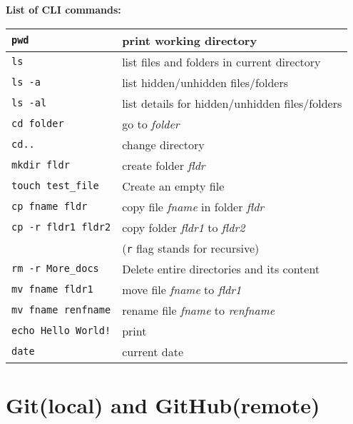\documentclass[a4paper,12pt]{report}
\newcommand{\code}[1]{\texttt{#1} }
\begin{document}
\textbf{List of CLI commands:}\\
\begin{table}[H]
\centering
\begin{tabular}{|l|l|}
  \hline
  \code{\textcolor[rgb]{0,0,1}{pwd}} & print working directory \\
	\hline
  \code{\textcolor[rgb]{0,0,1}{ls}} & list files and folders in current directory \\
	\hline
  \code{\textcolor[rgb]{0,0,1}{ls} \textcolor[rgb]{1,0,0}{-a}} & list hidden/unhidden files/folders \\
	\hline
  \code{\textcolor[rgb]{0,0,1}{ls} \textcolor[rgb]{1,0,0}{-al}} & list details for hidden/unhidden files/folders \\
	\hline
	\code{\textcolor[rgb]{0,0,1}{cd} folder} & go to \textit{folder}\\
	\hline
	\code{\textcolor[rgb]{0,0,1}{cd}..} & change directory \\
	\hline
	\code{\textcolor[rgb]{0,0,1}{mkdir} fldr} & create folder \textit{fldr} \\
	\hline
	\code{\textcolor[rgb]{0,0,1}{touch} test\_file} & Create an empty file \\
	\hline
	\code{\textcolor[rgb]{0,0,1}{cp} fname fldr}  & copy file \textit{fname} in folder \textit{fldr} \\
	\hline
	\code{\textcolor[rgb]{0,0,1}{cp} \textcolor[rgb]{1,0,0}{-r} fldr1 fldr2}  & copy folder \textit{fldr1} to \textit{fldr2}  \\
	& (\code{\-r} flag stands for recursive) \\
	\hline
	\code{\textcolor[rgb]{0,0,1}{rm} \textcolor[rgb]{1,0,0}{-r} More\_docs} & Delete entire directories and its content \\
	\hline
	\code{\textcolor[rgb]{0,0,1}{mv} fname fldr1} & move file \textit{fname} to \textit{fldr1} \\
	\hline
	\code{\textcolor[rgb]{0,0,1}{mv} fname renfname} & rename file \textit{fname} to \textit{renfname} \\
	\hline
	\code{\textcolor[rgb]{0,0,1}{echo} Hello World!} & print \\
	\hline
	\code{\textcolor[rgb]{0,0,1}{date}} & current date \\ 
  \hline
\end{tabular}
\end{table}





\part{Git(local) and GitHub(remote)}
\end{document}
